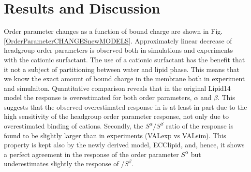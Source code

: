 \documentclass[aip,jcp,twocolumn]{revtex4}
\begin{document}
{\section{Results and Discussion}

Order parameter changes as a function of bound charge are shown in
Fig. \ref{OrderParameterCHANGESnewMODELS}. 
Approximately linear decrease of headgroup order parameters is observed both in simulations and experiments with the cationic surfactant. 
The use of a cationic surfactant has the benefit that it not a subject of partitioning between water and lipid phase. 
This means that we know the exact amount of bound charge in the membrane both in experiment and simulaiton. 
Quantitative comparison reveals that in the original Lipid14 model the response is overestimated for both order parameters, $\alpha$ and $\beta$. 
This suggests that the observed overestimated response in \cite{catte16} 
is at least in part due to the high sensitivity of the headgroup order parameter response, 
not only due to overestimated binding of cations. 
Secondly, the $S^\alpha/S^\beta$ ratio of the response is found to be slightly larger than in experiments (VALexp vs VALsim).
This property is kept also by the newly derived model, ECClipid, and, hence, 
it shows a perfect agreement in the response of the order parameter $S^\alpha$ 
but underestimates slightly the response of $/S^\beta$. 



}
\end{document}
